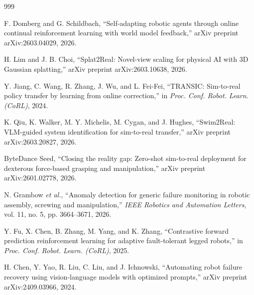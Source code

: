 \documentclass[12pt,a4paper,oneside]{report}
\begin{document}
\begin{thebibliography}{999}

F. Domberg and G. Schildbach, ``Self-adapting robotic agents through online continual reinforcement learning with world model feedback,'' arXiv preprint arXiv:2603.04029, 2026.




H. Lim and J. B. Choi, ``Splat2Real: Novel-view scaling for physical {AI} with {3D} Gaussian splatting,'' arXiv preprint arXiv:2603.10638, 2026.




Y. Jiang, C. Wang, R. Zhang, J. Wu, and L. Fei-Fei, ``{TRANSIC}: Sim-to-real policy transfer by learning from online correction,'' in \textit{Proc. Conf. Robot. Learn. (CoRL)}, 2024.




K. Qiu, K. Walker, M. Y. Michelis, M. Cygan, and J. Hughes, ``Swim2Real: VLM-guided system identification for sim-to-real transfer,'' arXiv preprint arXiv:2603.20827, 2026.




ByteDance Seed, ``Closing the reality gap: Zero-shot sim-to-real deployment for dexterous force-based grasping and manipulation,'' arXiv preprint arXiv:2601.02778, 2026.





N. Grambow \textit{et al.}, ``Anomaly detection for generic failure monitoring in robotic assembly, screwing and manipulation,'' \textit{IEEE Robotics and Automation Letters}, vol. 11, no. 5, pp. 3664--3671, 2026.




Y. Fu, X. Chen, B. Zhang, M. Yang, and K. Zhang, ``Contrastive forward prediction reinforcement learning for adaptive fault-tolerant legged robots,'' in \textit{Proc. Conf. Robot. Learn. (CoRL)}, 2025.




H. Chen, Y. Yao, R. Liu, C. Liu, and J. Ichnowski, ``Automating robot failure recovery using vision-language models with optimized prompts,'' arXiv preprint arXiv:2409.03966, 2024.




\end{thebibliography}
\end{document}
